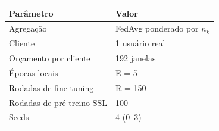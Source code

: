\begin{tabular}{ll}
\toprule
\textbf{Parâmetro} & \textbf{Valor} \\
\midrule
Agregação & FedAvg ponderado por $n_k$ \\
Cliente & 1 usuário real \\
Orçamento por cliente & 192 janelas \\
Épocas locais & E = 5 \\
Rodadas de fine-tuning & R = 150 \\
Rodadas de pré-treino SSL & 100 \\
Seeds & 4 (0--3) \\
\bottomrule
\end{tabular}
